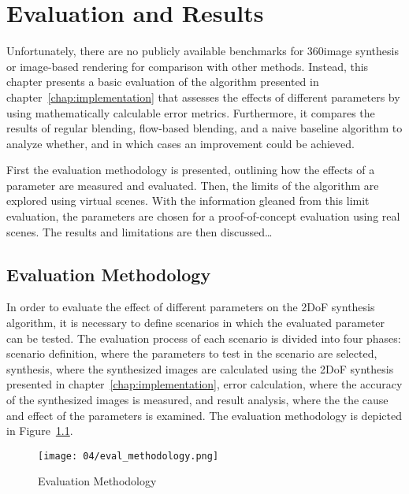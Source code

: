 \chapter{Evaluation and Results} \label{chap:evaluation}

Unfortunately, there are no publicly available benchmarks for 360\degree image synthesis or image-based rendering for comparison with other methods. Instead, this chapter presents a basic evaluation of the algorithm presented in chapter~\ref{chap:implementation} that assesses the effects of different parameters by using mathematically calculable error metrics. Furthermore, it compares the results of regular blending, flow-based blending, and a naive baseline algorithm to analyze whether, and in which cases an improvement could be achieved.

First the evaluation methodology is presented, outlining how the effects of a parameter are measured and evaluated. Then, the limits of the algorithm are explored using virtual scenes. With the information gleaned from this limit evaluation, the parameters are chosen for a proof-of-concept evaluation using real scenes. The results and limitations are then discussed\ldots


\section{Evaluation Methodology}
In order to evaluate the effect of different parameters on the 2DoF synthesis algorithm, it is necessary to define scenarios in which the evaluated parameter can be tested. The evaluation process of each scenario is divided into four phases: scenario definition, where the parameters to test in the scenario are selected, synthesis, where the synthesized images are calculated using the 2DoF synthesis presented in chapter~\ref{chap:implementation}, error calculation, where the accuracy of the synthesized images is measured, and result analysis, where the the cause and effect of the parameters is examined. The evaluation methodology is depicted in Figure~\ref{fig:eval-methodology}.

\begin{figure}
		\centering
		\texttt{[image: 04/eval\_methodology.png]}
		\caption{Evaluation Methodology}
		\label{fig:eval-methodology}
\end{figure}

